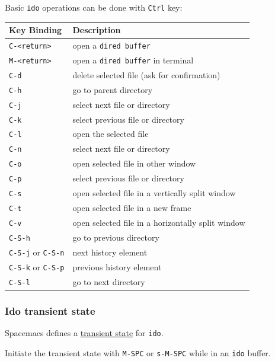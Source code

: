 \documentclass[11pt]{article}
\begin{document}
Basic \texttt{ido} operations can be done with \texttt{Ctrl} key:

\begin{center}
\begin{tabular}{ll}
Key Binding & Description\\
\hline
\texttt{C-<return>} & open a \texttt{dired buffer}\\
\texttt{M-<return>} & open a \texttt{dired buffer} in terminal\\
\texttt{C-d} & delete selected file (ask for confirmation)\\
\texttt{C-h} & go to parent directory\\
\texttt{C-j} & select next file or directory\\
\texttt{C-k} & select previous file or directory\\
\texttt{C-l} & open the selected file\\
\texttt{C-n} & select next file or directory\\
\texttt{C-o} & open selected file in other window\\
\texttt{C-p} & select previous file or directory\\
\texttt{C-s} & open selected file in a vertically split window\\
\texttt{C-t} & open selected file in a new frame\\
\texttt{C-v} & open selected file in a horizontally split window\\
\texttt{C-S-h} & go to previous directory\\
\texttt{C-S-j} or \texttt{C-S-n} & next history element\\
\texttt{C-S-k} or \texttt{C-S-p} & previous history element\\
\texttt{C-S-l} & go to next directory\\
\end{tabular}
\end{center}

\subsubsection{Ido transient state}
\label{sec:org064c27f}
Spacemacs defines a \hyperref[sec:orgb0bb9d9]{transient state} for \texttt{ido}.

Initiate the transient state with \texttt{M-SPC} or \texttt{s-M-SPC} while in an \texttt{ido} buffer.
\end{document}
